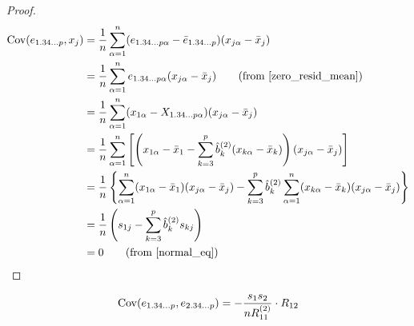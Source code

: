 \documentclass[10pt]{article}
\begin{document}
\begin{proof}
    \begin{align*}
    \Cov(e_{1.34\dots p}, x_j) &= \frac{1}{n} \sum_{\alpha=1}^{n} (e_{1.34\dots p \alpha} - \bar{e}_{1.34\dots p})(x_{j\alpha} - \bar{x}_j) \\
			       &= \frac{1}{n} \sum_{\alpha=1}^{n} e_{1.34\dots p \alpha}(x_{j\alpha} - \bar{x}_j) \tag*{(from \eqref{zero_resid_mean})} \\
    &= \frac{1}{n} \sum_{\alpha=1}^{n} (x_{1\alpha} - X_{1.34\dots p \alpha})(x_{j\alpha} - \bar{x}_j) \\
    &= \frac{1}{n} \sum_{\alpha=1}^{n} \left[ \left( x_{1\alpha} - \bar{x}_1 - \sum_{k=3}^{p} \hat{b}_k^{(2)}(x_{k\alpha} - \bar{x}_k) \right) (x_{j\alpha} - \bar{x}_j) \right] \\
    &= \frac{1}{n} \left\{ \sum_{\alpha=1}^{n} (x_{1\alpha} - \bar{x}_1)(x_{j\alpha} - \bar{x}_j) - \sum_{k=3}^{p} \hat{b}_{k}^{(2)} \sum_{\alpha=1}^{n} (x_{k\alpha} - \bar{x}_k)(x_{j\alpha} - \bar{x}_j) \right\} \\ 
    &= \frac{1}{n} \left( s_{1j} - \sum_{k=3}^{p} \hat{b}_k^{(2)} s_{kj} \right) \\
    &= 0 \tag*{(from \eqref{normal_eq})}
\end{align*}
\end{proof}

\begin{lemma}
\begin{equation}
	\operatorname{Cov}(e_{1.34\dots p}, e_{2.34\dots p}) = -\frac{s_1 s_2}{n R_{11}^{(2)}} \cdot R_{12} \label{cov_resid}
\end{equation}
\end{lemma}
\end{document}
